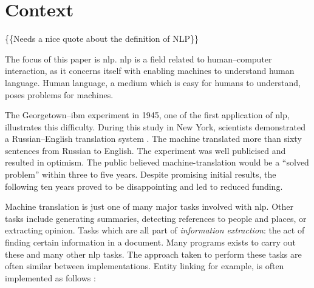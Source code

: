 \chapter{Context}\label{context}

\{\{Needs a nice quote about the definition of NLP\}\}

The focus of this paper is \gls{nlp}.
\gls{nlp} is a field related to human--computer interaction, as it
  concerns itself with enabling machines to understand human language.
Human language, a medium which is easy for humans to understand, poses
  problems for machines.

The Georgetown--\gls{ibm} experiment in 1945, one of the first application
  of \gls{nlp}, illustrates this difficulty.
During this study in New York, scientists demonstrated a
  Russian--English translation system
  \autocite{hutchins-john-georgetown-ibm-system}.
The machine translated more than sixty sentences from Russian to English.
The experiment was well publicised and resulted in optimism.
The public believed machine-translation would be a ``solved problem'' within
  three to five years.
Despite promising initial results, the following ten years proved to be
  disappointing and led to reduced funding.

Machine translation is just one of many major tasks involved with \gls{nlp}.
Other tasks include generating summaries, detecting references to people
  and places, or extracting opinion.
Tasks which are all part of \emph{information extraction}: the act of finding
  certain information in a document.
Many programs exists to carry out these and many other \gls{nlp} tasks.
The approach taken to perform these tasks are often similar between
  implementations.
Entity linking for example, is often implemented as follows
  \autocite[according to][]{stanbol-enhancer-nlp}:

